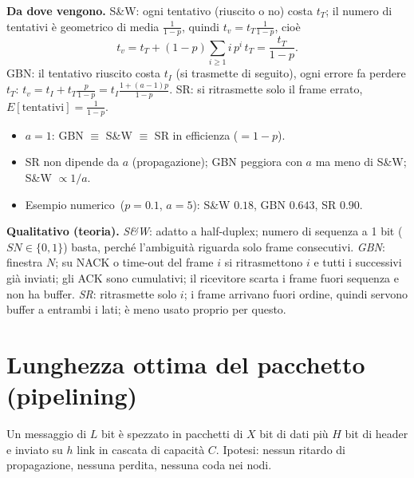 \textbf{Da dove vengono.} S\&W: ogni tentativo (riuscito o no) costa $t_T$; il numero di tentativi è geometrico di media $\tfrac1{1-p}$, quindi $t_v=t_T\tfrac1{1-p}$, cioè
\[
t_v=t_T+(1-p)\sum_{i\ge1}i\,p^i\,t_T=\frac{t_T}{1-p}.
\]
GBN: il tentativo riuscito costa $t_I$ (si trasmette di seguito), ogni errore fa perdere $t_T$: $t_v=t_I+t_T\tfrac{p}{1-p}=t_I\tfrac{1+(a-1)p}{1-p}$. SR: si ritrasmette solo il frame errato, $E[\text{tentativi}]=\tfrac1{1-p}$.

\begin{nota}
\begin{itemize}[nosep]
\item $a=1$: GBN $\equiv$ S\&W $\equiv$ SR in efficienza ($=1-p$).
\item SR non dipende da $a$ (propagazione); GBN peggiora con $a$ ma meno di S\&W; S\&W $\propto1/a$.
\item Esempio numerico\mio\ ($p=0.1$, $a=5$): S\&W $0.18$, GBN $0.643$, SR $0.90$.
\end{itemize}
\end{nota}

\textbf{Qualitativo (teoria).} \emph{S\&W}: adatto a half-duplex; numero di sequenza a 1 bit ($SN\in\{0,1\}$) basta, perché l'ambiguità riguarda solo frame consecutivi. \emph{GBN}: finestra $N$; su NACK o time-out del frame $i$ si ritrasmettono $i$ e tutti i successivi già inviati; gli ACK sono cumulativi; il ricevitore scarta i frame fuori sequenza e non ha buffer. \emph{SR}: ritrasmette solo $i$; i frame arrivano fuori ordine, quindi servono buffer a entrambi i lati; è meno usato proprio per questo.

\section{Lunghezza ottima del pacchetto (pipelining)}\label{sec:cap6-pipe}

Un messaggio di $L$ bit è spezzato in pacchetti di $X$ bit di dati più $H$ bit di header e inviato su $h$ link in cascata di capacità $C$. Ipotesi: nessun ritardo di propagazione, nessuna perdita, nessuna coda nei nodi.

\begin{center}
\end{center}

